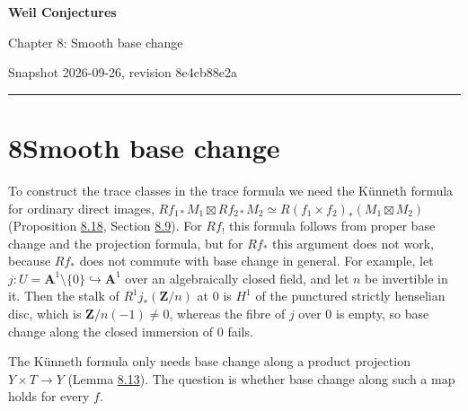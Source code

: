 \documentclass[11pt]{article}
\begin{document}
\pagestyle{plain}
\begin{center}
{\LARGE\bfseries Weil Conjectures\par}
\vspace{0.7em}
{\large Chapter 8: Smooth base change\par}
\vspace{0.5em}
{\small\color{bpmuted}Snapshot 2026-09-26, revision 8e4cb88e2a\par}
\end{center}
\vspace{0.5em}
{\small\tableofcontents}
\bigskip\hrule\bigskip

\section*{\texorpdfstring{8\quad Smooth base change}{8 Smooth base change}}
\label{bp1}%
\label{bp2}%
To construct the trace classes in the trace formula we need the Künneth formula for ordinary direct images, \(Rf_{1*}M_1\boxtimes Rf_{2*}M_2\simeq R(f_1\times f_2)_*(M_1\boxtimes M_2)\) (Proposition \hyperref[bp64]{8.18}, Section \hyperref[bp49]{8.9}). For \(Rf_!\) this formula follows from proper base change and the projection formula, but for \(Rf_*\) this argument does not work, because \(Rf_*\) does not commute with base change in general. For example, let \(j:U=\mathbf A^1\setminus\{0\}\hookrightarrow\mathbf A^1\) over an algebraically closed field, and let \(n\) be invertible in it. Then the stalk of \(R^1j_*(\mathbf Z/n)\) at \(0\) is \(H^1\) of the punctured strictly henselian disc, which is \(\mathbf Z/n(-1)\neq0\), whereas the fibre of \(j\) over \(0\) is empty, so base change along the closed immersion of \(0\) fails.

The Künneth formula only needs base change along a product projection \(Y\times T\to Y\) (Lemma \hyperref[bp51]{8.13}). The question is whether base change along such a map holds for every \(f\).
\end{document}
